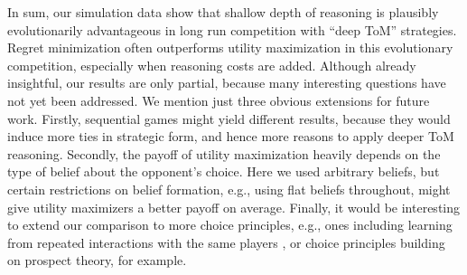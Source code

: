 \documentclass{llncs}
\begin{document}
In sum, our simulation data show that shallow depth of reasoning is
plausibly evolutionarily advantageous in long run competition with
``deep ToM'' strategies. Regret minimization often outperforms utility
maximization in this evolutionary competition, especially when
reasoning costs are added. Although already insightful, our results
are only partial, because many interesting questions have not yet been
addressed. We mention just three obvious extensions for future
work. Firstly, sequential games might yield different results, because
they would induce more ties in strategic form, and hence more reasons
to apply deeper ToM reasoning. Secondly, the payoff of utility
maximization heavily depends on the type of belief about the
opponent's choice. Here we used arbitrary beliefs, but certain
restrictions on belief formation, e.g., using flat beliefs throughout,
might give utility maximizers a better payoff on average. Finally, it
would be interesting to extend our comparison to more choice
principles, e.g., ones including learning from repeated interactions
with the same players
\citep[][]{Weerdde-WeerdVerbrugge2013:How-much-does-i}, or choice
principles building on prospect theory, for example.

\printbibliography[heading=bibintoc]
\end{document}
